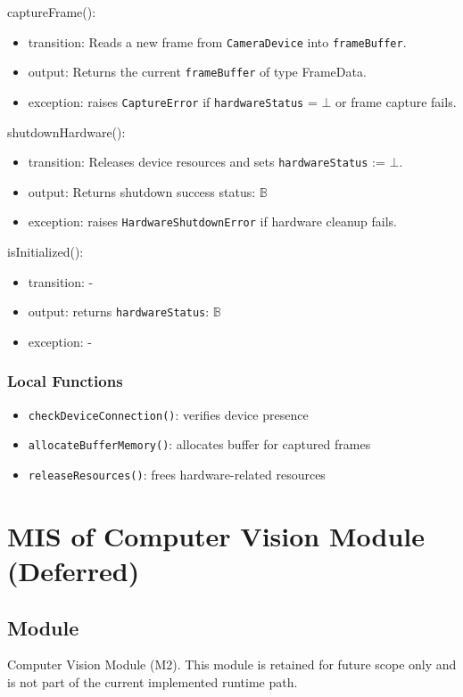 \documentclass[12pt, titlepage]{article}
\begin{document}
\noindent captureFrame():
\begin{itemize}
\item transition: Reads a new frame from \texttt{CameraDevice} into \texttt{frameBuffer}.
\item output: Returns the current \texttt{frameBuffer} of type FrameData.
\item exception: raises \texttt{CaptureError} if \texttt{hardwareStatus} = $\bot$
                 or frame capture fails.
\end{itemize}

\noindent shutdownHardware():
\begin{itemize}
\item transition: Releases device resources and sets  
      \texttt{hardwareStatus} := $\bot$.
\item output: Returns shutdown success status: $\mathbb{B}$
\item exception: raises \texttt{HardwareShutdownError} if hardware cleanup fails.
\end{itemize}

\noindent isInitialized():
\begin{itemize}
\item transition: -
\item output: returns \texttt{hardwareStatus}: $\mathbb{B}$
\item exception: -
\end{itemize}

\subsubsection{Local Functions}
\begin{itemize}
\item \texttt{checkDeviceConnection()}: verifies device presence
\item \texttt{allocateBufferMemory()}: allocates buffer for captured frames
\item \texttt{releaseResources()}: frees hardware-related resources
\end{itemize}



\section{MIS of Computer Vision Module (Deferred)} \label{M2}

\subsection{Module}
Computer Vision Module (M2).
This module is retained for future scope only and is not part of the current implemented runtime path.
\end{document}
